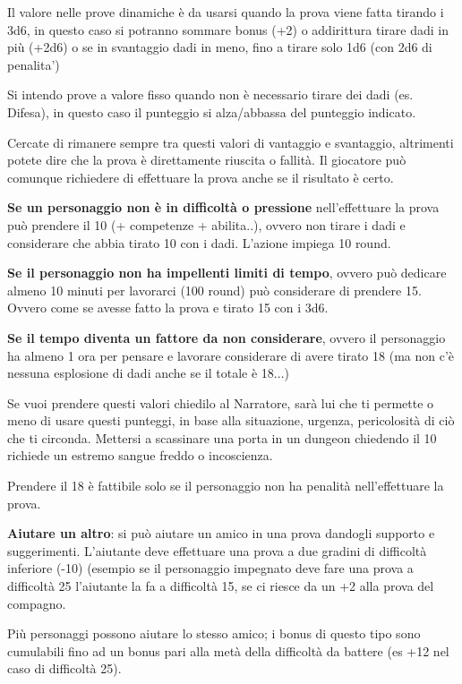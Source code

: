 \documentclass[a4paper,11pt,twoside,openany]{book}
\begin{document}
\bigskip

Il valore nelle prove dinamiche è da usarsi quando la prova viene fatta tirando i 3d6, in questo caso si potranno sommare bonus (+2) o addirittura tirare dadi in più (+2d6) o se in svantaggio dadi in meno, fino a tirare solo 1d6 (con 2d6 di penalita')

Si intendo prove a valore fisso quando non è necessario tirare dei dadi (es. Difesa), in questo caso il punteggio si alza/abbassa del punteggio indicato.

Cercate di rimanere sempre tra questi valori di vantaggio e svantaggio, altrimenti potete dire che la prova è direttamente riuscita o fallità.
Il giocatore può comunque richiedere di effettuare la prova anche se il risultato è certo.

\textbf{Se un personaggio non è in difficoltà o pressione} nell'effettuare la prova può prendere il 10 (+ competenze + abilita..), ovvero non tirare i dadi e considerare che abbia tirato 10 con i dadi. L'azione impiega 10 round.

\textbf{Se il personaggio non ha impellenti limiti di tempo}, ovvero può dedicare almeno 10 minuti per lavorarci (100 round) può considerare di prendere 15. Ovvero come se avesse fatto la prova e tirato 15 con i 3d6.

\textbf{Se il tempo diventa un fattore da non considerare}, ovvero il personaggio ha almeno 1 ora per pensare e lavorare considerare di avere tirato 18 (ma non c'è nessuna esplosione di dadi anche se il totale è 18...)

Se vuoi prendere questi valori chiedilo al Narratore, sarà lui che ti permette o meno di usare questi punteggi, in base alla situazione, urgenza, pericolosità di ciò che ti circonda. Mettersi a scassinare una porta in un dungeon chiedendo il 10 richiede un estremo sangue freddo o incoscienza.


Prendere il 18 è fattibile solo se il personaggio non ha penalità nell'effettuare la prova.

\textbf{Aiutare un altro}: si può aiutare un amico in una prova dandogli supporto e suggerimenti. L'aiutante deve effettuare una prova a due gradini di difficoltà inferiore (-10) (esempio se il personaggio impegnato deve fare una prova a difficoltà 25 l'aiutante la fa a difficoltà 15, se ci riesce da un +2 alla prova del compagno.


Più personaggi possono aiutare lo stesso amico; i bonus di questo tipo sono cumulabili fino ad un bonus pari alla metà della difficoltà da battere (es +12 nel caso di difficoltà 25).
\end{document}

